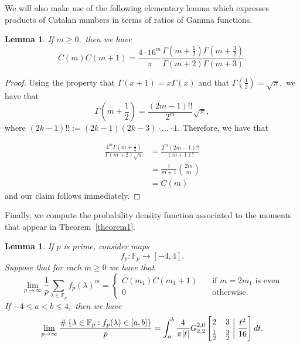 \documentclass[12pt]{amsart}
\newtheorem{lemma}[theorem]{Lemma}
\theoremstyle{definition}
\theoremstyle{remark}
\numberwithin{equation}{section}
\def\F{{\mathbb F}}
\def\F{\mathbb{F}}
\begin{document}
We will also make use of the following elementary lemma which expresses products of Catalan numbers in terms of ratios of Gamma functions.

\begin{lemma}\label{CatalanGamma}
    If $m \geq 0,$ then we have
    $$
     C(m)C(m+1) = \frac{4 \cdot 16^{m}}{\pi} \frac{\Gamma\left(m+\frac{1}{2}\right)\Gamma\left(m+\frac{3}{2}\right)}{\Gamma(m+2)\Gamma(m+3)}.
    $$
\end{lemma}

\begin{proof}

Using the property that $\Gamma(x+1)=x\Gamma(x)$ and that $\Gamma(\frac{1}{2})=\sqrt{\pi},$ we have that
$$
\Gamma\left(m+\frac{1}{2}\right) = \frac{(2m-1)!!}{2^m} \sqrt{\pi},
$$
where $(2k-1)!!:=(2k-1)(2k-3)\cdot\ldots\cdot 1.$ Therefore, we have that


\begin{equation*}
\begin{split}
\frac{4^{m}\Gamma\left(m+\frac{1}{2}\right)}{\Gamma(m+2)\sqrt{\pi}} &= \frac{2^{m}(2m-1)!!}{(m+1)!}\\
&= \frac{1}{m+1} \binom{2m}{m}\\
&= C(m)
\end{split}
\end{equation*}
and our claim follows immediately.
\end{proof}

Finally, we compute the probability density function associated to the moments that appear in Theorem~\ref{theorem1}.

\begin{lemma}\label{momentsPDF}
    If $p$ is prime, consider maps
    $$
    f_{p}:\F_p\to [-4,4].
    $$
    Suppose that for each $m\geq 0$ we have that
    $$
    \lim\limits_{p\to\infty}\frac{1}{p}\sum\limits_{\lambda\in\F_p}f_{p}(\lambda)^m=\begin{cases}
        C(m_1)C(m_1+1) &\ \ \ \text{ if } m=2m_1\text{ is even}\\
        0 &\ \ \ \text{ otherwise}.
    \end{cases}
    $$
    If $-4\leq a< b\leq 4,$ then we have
    $$
    \lim\limits_{p\to\infty}\frac{\#\left\{\lambda\in\F_p : f_p(\lambda)\in[a,b] \right\}}{p} = \int_a^b\frac{4}{\pi |t|} G_{2,2}^{2,0} \left[\begin{matrix} 2 & 3 \smallskip \\  \frac{1}{2} & \frac{3}{2}\end{matrix} \; \bigg| \; \frac{t^2}{16} \right]dt.
    $$
\end{lemma}
\end{document}
